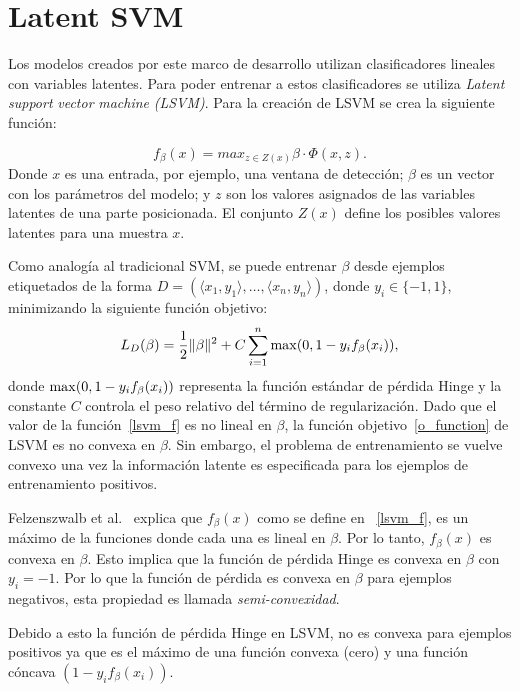 \section{Latent SVM}\label{sec:lsvmIV}
Los modelos creados por este marco de desarrollo utilizan clasificadores lineales con variables latentes. Para poder entrenar a estos clasificadores se utiliza \textit{Latent} \textit{support} \textit{vector} \textit{machine} \textit{(LSVM)}. Para la creación de LSVM se crea la siguiente función:

\begin{equation}\label{lsvm_f}
f_{\beta}(x) = max_{z \in Z(x)} \beta \cdot \Phi (x, z).
\end{equation}
Donde $x$ es una entrada, por ejemplo, una ventana de detección; $\beta$ es un vector con los parámetros del modelo; y $z$ son los valores asignados de las variables latentes de una parte posicionada. El conjunto $Z(x)$ define los posibles valores latentes para una muestra $x$.

Como analogía al tradicional SVM, se puede entrenar $\beta$ desde ejemplos etiquetados de la forma $D = (\langle x_1, y_1 \rangle, \dots, \langle x_n, y_n \rangle)$, donde $y_i \in \{-1, 1\}$, minimizando la siguiente función objetivo:
\begin{equation}\label{o_function}
L_D(\beta) = \frac{1}{2} \Vert \beta \Vert^2 + C \sum_{i=1}^n {\rm max} (0, 1-y_if_\beta (x_i)),
\end{equation}
donde ${\rm max} (0, 1-y_if_\beta(x_i))$ representa la función estándar de pérdida Hinge y la constante $C$ controla el peso relativo del término de regularización. Dado que el valor de la función~\ref{lsvm_f} es no lineal en $\beta$, la función objetivo~\ref{o_function} de LSVM es no convexa en $\beta$. Sin embargo, el problema de entrenamiento se vuelve convexo una vez la información latente es especificada para los ejemplos de entrenamiento positivos.

Felzenszwalb et al.~\cite{Felzenszwalb2010} explica que $f_{\beta}(x)$ como se define en ~\ref{lsvm_f}, es un máximo de la funciones donde cada una es lineal en $\beta$. Por lo tanto, $f_{\beta}(x)$ es convexa en $\beta$. Esto implica que la función de pérdida Hinge es convexa en $\beta$ con $y_i = -1$. Por lo que la función de pérdida es convexa en $\beta$ para ejemplos negativos, esta propiedad es llamada \textit{semi-convexidad}.

Debido a esto la función de pérdida Hinge en LSVM, no es convexa para ejemplos positivos ya que es el máximo de una función convexa (cero) y una función cóncava $(1-y_if_{\beta}(x_i))$.

